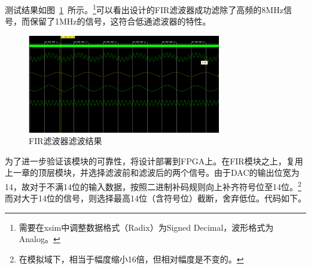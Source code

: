 测试结果如图~\ref{fig:exp5:result}~所示。\footnote{需要在xsim中调整数据格式（Radix）为Signed Decimal，波形格式为Analog。}可以看出设计的FIR滤波器成功滤除了高频的8MHz信号，而保留了1MHz的信号，这符合低通滤波器的特性。
\begin{figure}[htbp]
  \centering
  \includegraphics[width=0.75\textwidth]{figure/exp5/waveform.png}
  \caption{FIR滤波器滤波结果}
  \label{fig:exp5:result}
\end{figure}

为了进一步验证该模块的可靠性，将设计部署到FPGA上。在FIR模块之上，复用上一章的顶层模块，并选择滤波前和滤波后的两个信号。由于DAC的输出位宽为14，故对于不满14位的输入数据，按照二进制补码规则向上补齐符号位至14位。\footnote{在模拟域下，相当于幅度缩小16倍，但相对幅度是不变的。}而对大于14位的信号，则选择最高14位（含符号位）截断，舍弃低位。代码如下。

